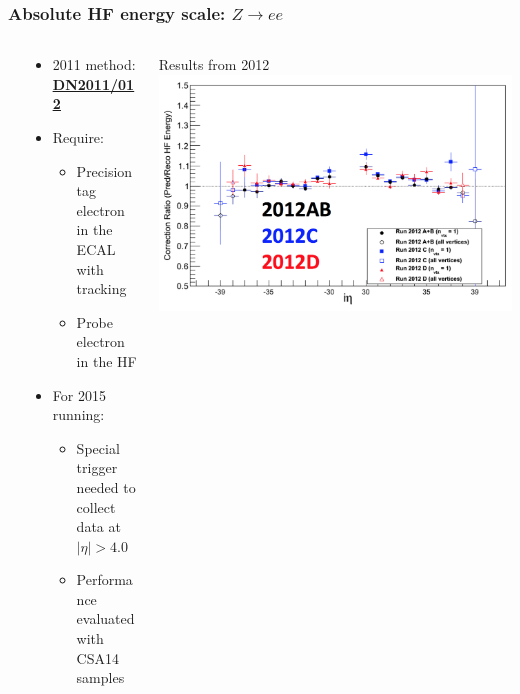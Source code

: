 \documentclass[bigger]{beamer}
\providecommand{\alert}[1]{\textbf{#1}}
\begin{document}
\begin{frame}
\frametitle{Absolute HF energy scale: $Z\rightarrow ee$}
\label{sec-2-4-3}
\begin{columns} %
\label{sec-2-4-3-1}
\begin{column}{0.55\textwidth}
\label{sec-2-4-3-1-1}
\begin{itemize}

\item 2011 method: \href{http://cms.cern.ch/iCMS/jsp/openfile.jsp?type=DN&year=2011&files=DN2011_012.pdf}{\underline{\alert{DN2011/012}}}
\label{sec-2-4-3-1-1-1}%

\item Require:
\label{sec-2-4-3-1-1-2}%
\begin{itemize}

\item Precision tag electron in the ECAL with tracking
\label{sec-2-4-3-1-1-2-1}%

\item Probe electron in the HF
\label{sec-2-4-3-1-1-2-2}%
\end{itemize} %

\item For 2015 running:
\label{sec-2-4-3-1-1-3}%
\begin{itemize}

\item Special trigger needed to collect data at $|\eta| > 4.0$
\label{sec-2-4-3-1-1-3-1}%

\item Performance evaluated with CSA14 samples
\label{sec-2-4-3-1-1-3-2}%
\end{itemize} %
\end{itemize} %
\end{column}
\begin{column}{0.55\textwidth}
\label{sec-2-4-3-1-2}

\centering
Results from 2012
\includegraphics[width=\textwidth]{fig/HF_Zee.png}
\end{column}
\end{columns}
\end{frame}
\end{document}
